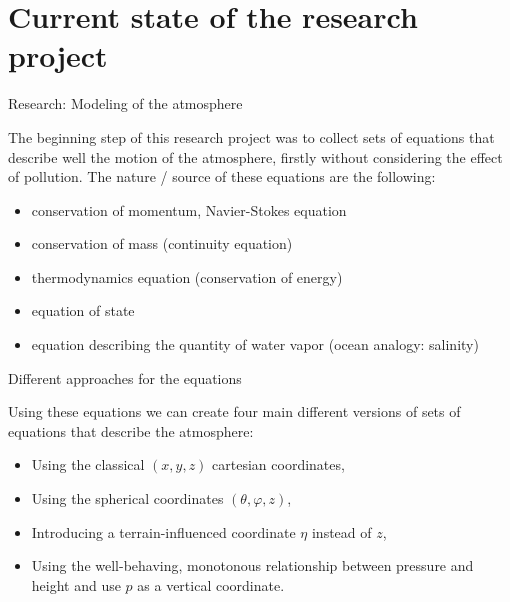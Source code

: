 \documentclass{beamer}
\begin{document}
\section{Current state of the research project}

\begin{frame}{Research: Modeling of the atmosphere}

  The beginning step of this research project was to collect sets of equations that describe well the motion of the atmosphere, firstly without considering the effect of pollution. The nature / source of these equations are the following:
  \begin{itemize}
  \item
    conservation of momentum, Navier-Stokes equation
  \item
    conservation of mass (continuity equation)
  \item
    thermodynamics equation (conservation of energy)
  \item
    equation of state
  \item
    equation describing the quantity of water vapor (ocean analogy: salinity)
  \end{itemize}

\end{frame}

\begin{frame}{Different approaches for the equations}

  Using these equations we can create four main different versions of sets of equations that describe the atmosphere:
  \begin{itemize}
  \item
    Using the classical $(x, y, z)$ cartesian coordinates,
  \item
    Using the spherical coordinates $(\theta, \varphi, z)$,
  \item
    Introducing a terrain-influenced coordinate $\eta$ instead of $z$,
  \item
    Using the well-behaving, monotonous relationship between pressure and height and use $p$ as a vertical coordinate.
  
  \end{itemize}

\end{frame}
\end{document}
